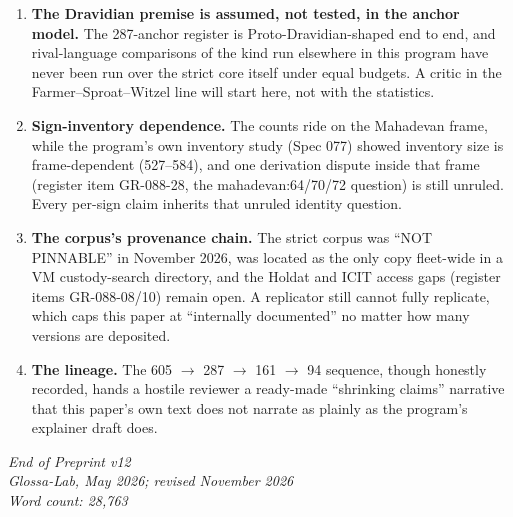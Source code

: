 \documentclass[11pt]{article}
\providecommand{\tightlist}{%
  \setlength{\itemsep}{0pt}\setlength{\parskip}{0pt}}
\begin{document}
\begin{enumerate}
\def\labelenumi{\arabic{enumi}.}
\tightlist
\item
  \textbf{The Dravidian premise is assumed, not tested, in the
  anchor model.} The 287-anchor register is Proto-Dravidian-shaped
  end to end, and rival-language comparisons of the kind run
  elsewhere in this program have never been run over the strict
  core itself under equal budgets. A critic in the
  Farmer--Sproat--Witzel line will start here, not with the
  statistics.
\item
  \textbf{Sign-inventory dependence.} The counts ride on the
  Mahadevan frame, while the program's own inventory study (Spec
  077) showed inventory size is frame-dependent (527--584), and
  one derivation dispute inside that frame (register item
  GR-088-28, the mahadevan:64/70/72 question) is still unruled.
  Every per-sign claim inherits that unruled identity question.
\item
  \textbf{The corpus's provenance chain.} The strict corpus was
  ``NOT PINNABLE'' in November 2026, was located as the only copy
  fleet-wide in a VM custody-search directory, and the Holdat and
  ICIT access gaps (register items GR-088-08/10) remain open. A
  replicator still cannot fully replicate, which caps this paper
  at ``internally documented'' no matter how many versions are
  deposited.
\item
  \textbf{The lineage.} The 605 $\rightarrow$ 287 $\rightarrow$
  161 $\rightarrow$ 94 sequence, though honestly recorded, hands a
  hostile reviewer a ready-made ``shrinking claims'' narrative
  that this paper's own text does not narrate as plainly as the
  program's explainer draft does.
\end{enumerate}

\emph{End of Preprint v12}\\
\emph{Glossa-Lab, May 2026; revised November 2026}\\
\emph{Word count: 28,763}
\end{document}
